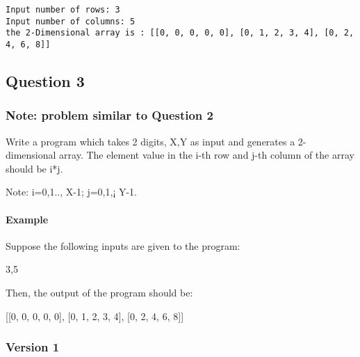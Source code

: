 \documentclass[11pt]{article}
\begin{document}
    \begin{Verbatim}[commandchars=\\\{\}]
Input number of rows: 3
Input number of columns: 5
the 2-Dimensional array is : [[0, 0, 0, 0, 0], [0, 1, 2, 3, 4], [0, 2, 4, 6, 8]]

    \end{Verbatim}

    \subsection{Question 3}\label{question-3}

    \subsubsection{Note: problem similar to Question
2}\label{note-problem-similar-to-question-2}

    Write a program which takes 2 digits, X,Y as input and generates a
2-dimensional array. The element value in the i-th row and j-th column
of the array should be i*j.

Note: i=0,1.., X-1; j=0,1,¡ Y-1.

\paragraph{Example}\label{example}

Suppose the following inputs are given to the program:

3,5

Then, the output of the program should be:

{[}{[}0, 0, 0, 0, 0{]}, {[}0, 1, 2, 3, 4{]}, {[}0, 2, 4, 6, 8{]}{]}

    \subsubsection{Version 1}\label{version-1}
\end{document}
